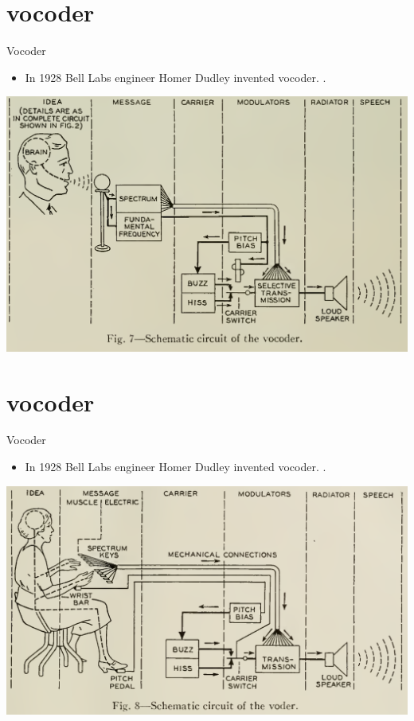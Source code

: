 \section{vocoder}
\begin{frame}{Vocoder}
\begin{itemize}
\item In 1928 Bell Labs engineer Homer Dudley invented vocoder. \href{https://archive.org/stream/bellsystemtechni19amerrich/bellsystemtechni19amerrich\#page/495/mode/1up}{\cite[508]{dudley40}}.
\end{itemize}
\centering
\includegraphics[width=\linewidth]{06-dudley}
\end{frame}

\section{vocoder}
\begin{frame}{Vocoder}
\begin{itemize}
\item In 1928 Bell Labs engineer Homer Dudley invented vocoder. \href{https://archive.org/stream/bellsystemtechni19amerrich/bellsystemtechni19amerrich\#page/495/mode/1up}{\cite[509]{dudley40}}.
\end{itemize}
\centering
\includegraphics[width=\linewidth]{07-dudley}
\end{frame}

